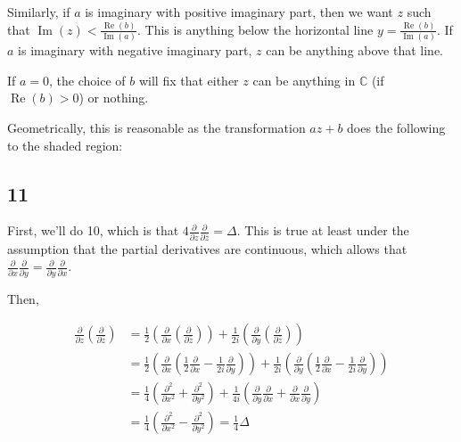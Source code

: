\documentclass[12pt,letterpaper]{article}
\theoremstyle{definition}
\newcommand{\C}{\mathbb{C}}
\DeclareMathOperator{\real}{Re}
\DeclareMathOperator{\imag}{Im}
\newcommand{\incfig}[1]{}
\begin{document}
Similarly, if $a$ is imaginary with positive imaginary part, then we want $z$
such that $\imag(z) < \frac{\real(b)}{\imag(a)}$. This is anything below the
horizontal line $y = \frac{\real(b)}{\imag(a)}$. If $a$ is imaginary with
negative imaginary part, $z$ can be anything above that line.

If $a = 0$, the choice of $b$ will fix that either $z$ can be anything in $\C$
(if $\real(b) > 0$) or nothing.

Geometrically, this is reasonable as the transformation $az + b$ does the
following to the shaded region:

\begin{figure}[H]
  \centering
  \incfig{trans}
\end{figure}

\subsection*{11}

First, we'll do 10, which is that $4\frac{\partial }{\partial z}\frac{\partial
}{\partial \bar{z}} = \Delta$. This is true at least under the assumption that the partial
derivatives are continuous, which allows that $\frac{\partial }{\partial
x}\frac{\partial }{\partial y} = \frac{\partial }{\partial y}\frac{\partial
}{\partial x}$.

Then,

\begin{align*}
  \frac{\partial }{\partial z}\left(\frac{\partial }{\partial \bar{z}}\right) &= \frac{1}{2}\left(\frac{\partial }{\partial x}\left(\frac{\partial }{\partial \bar{z}}\right)\right) + \frac{1}{2i}\left(\frac{\partial }{\partial y}\left(\frac{\partial }{\partial \bar{z}}\right)\right) \\
                                                                   &= \frac{1}{2}\left(\frac{\partial }{\partial x}\left(\frac{1}{2}\frac{\partial }{\partial x} - \frac{1}{2i}\frac{\partial }{\partial y}\right)\right) + \frac{1}{2i}\left(\frac{\partial }{\partial y}\left(\frac{1}{2}\frac{\partial }{\partial x} - \frac{1}{2i}\frac{\partial }{\partial y}\right)\right) \\
                                                                   &= \frac{1}{4}\left(\frac{\partial ^2}{\partial x^2} + \frac{\partial ^2}{\partial y^2}\right) + \frac{1}{4i} \left(\frac{\partial }{\partial y}\frac{\partial }{\partial x} + \frac{\partial }{\partial x}\frac{\partial}{\partial y}\right) \\
                                                                   &= \frac{1}{4}\left(\frac{\partial ^2}{\partial x^2} - \frac{\partial ^2}{\partial y^2}\right) = \frac{1}{4} \Delta
\end{align*}
\end{document}

